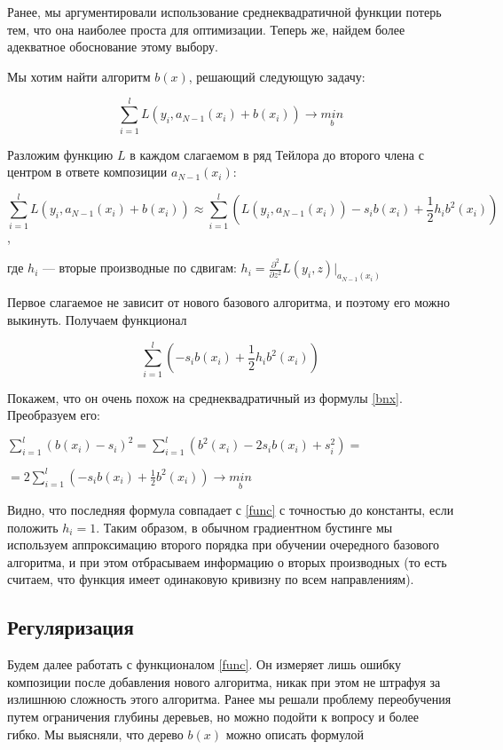 \documentclass{article}
\theoremstyle{definition}
\theoremstyle{theorem}
\theoremstyle{remark}
\theoremstyle{theorem}
\theoremstyle{example}
\theoremstyle{theorem}
\theoremstyle{theorem}
\theoremstyle{theorem}
\theoremstyle{theorem}
\begin{document}
Ранее, мы аргументировали использование среднеквадратичной функции потерь тем, что она наиболее проста для оптимизации. Теперь же, найдем более адекватное обоснование этому выбору.

Мы хотим найти алгоритм $b(x)$, решающий следующую задачу:

$$\sum\limits_{i=1}^{l} L \left(y_i, a_{N-1}(x_i) + b(x_i)\right) \rightarrow \underset{b}{min}$$

Разложим функцию $L$ в каждом слагаемом в ряд Тейлора до второго члена с центром
в ответе композиции $a_{N-1}(x_i)$:

$$\sum\limits_{i=1}^{l} L \left(y_i, a_{N-1}(x_i) + b(x_i)\right) \approx \sum\limits_{i=1}^{l}\left( L \left(y_i, a_{N-1}(x_i)\right) - s_i b(x_i) + \frac{1}{2} h_i b^2(x_i)\right)$$,

где  $h_i$ --- вторые производные по сдвигам: $h_i = \frac{\partial ^2}{\partial z^2} L(y_i,z)|_{a_{N-1}(x_i)}$

Первое слагаемое не зависит от нового базового алгоритма, и поэтому его можно
выкинуть. Получаем функционал

\begin{equation}\label{func}
	\sum\limits_{i=1}^{l}\left(  - s_i b(x_i) + \frac{1}{2} h_i b^2(x_i)\right)
\end{equation}


Покажем, что он очень похож на среднеквадратичный из формулы \ref{bnx}. Преобразуем его:

$\sum\limits_{i=1}^{l} (b(x_i) - s_i)^2 = \sum\limits_{i=1}^{l} (b^2(x_i) - 2s_i b(x_i) + s_i^2) =$

$ = 2\sum\limits_{i=1}^{l} (-s_i b(x_i) + \frac{1}{2} b^2(x_i)) \rightarrow \underset{b}{min}$


Видно, что последняя формула совпадает с \ref{func} с точностью до константы, если положить $h_i=1$. Таким образом, в обычном градиентном бустинге мы используем аппроксимацию второго порядка при обучении очередного базового алгоритма, и при этом отбрасываем информацию о вторых производных (то есть считаем, что функция имеет одинаковую кривизну по всем направлениям).

\subsection{Регуляризация}

Будем далее работать с функционалом \ref{func}. Он измеряет лишь ошибку композиции после добавления нового алгоритма, никак при этом не штрафуя за излишнюю
сложность этого алгоритма. Ранее мы решали проблему переобучения путем ограничения глубины деревьев, но можно подойти к вопросу и более гибко. Мы выясняли,
что дерево $b(x)$ можно описать формулой
\end{document}
